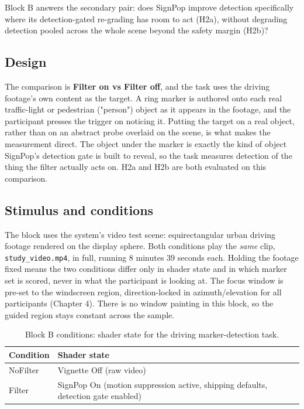 Block B answers the secondary pair: does SignPop improve detection specifically where its
detection-gated re-grading has room to act (H2a), without degrading detection pooled across the whole
scene beyond the safety margin (H2b)?

\subsection{Design}

The comparison is \textbf{Filter on vs Filter off}, and the task uses the driving footage's own
content as the target. A ring marker is authored onto each real traffic-light or pedestrian
("person") object as it appears in the footage, and the participant presses the trigger on noticing
it. Putting the target on a real object, rather than on an abstract probe overlaid on the scene, is
what makes the measurement direct. The object under the marker is exactly the kind of object
SignPop's detection gate is built to reveal, so the task measures detection of the thing the filter
actually acts on. H2a and H2b are both evaluated on this comparison.

\subsection{Stimulus and conditions}

The block uses the system's video test scene: equirectangular urban driving footage rendered on the
display sphere. Both conditions play the \textit{same} clip, \verb|study_video.mp4|, in full, running
8 minutes 39 seconds each. Holding the footage fixed means the two conditions differ only in shader
state and in which marker set is scored, never in what the participant is looking at. The focus
window is pre-set to the windscreen region, direction-locked in azimuth/elevation for all
participants (Chapter 4). There is no window painting in this block, so the guided region stays
constant across the sample.

\begin{longtable}{p{}|p{}}
\caption{Block B conditions: shader state for the driving marker-detection task.}\\
\hline
\textbf{Condition} & \textbf{Shader state} \\
\hline
\endhead
\hline
NoFilter & Vignette Off (raw video) \\
Filter & SignPop On (motion suppression active, shipping defaults, detection gate enabled) \\
\hline
\end{longtable}

